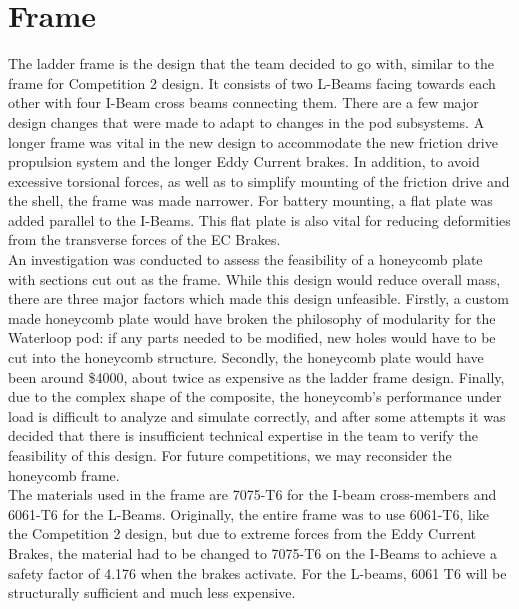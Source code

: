 \documentclass[main.tex]{subfiles}
\begin{document}
    \chapter{Frame}
    \label{ch:frame}
   	 The ladder frame is the design that the team decided to go with, similar to the frame for Competition 2 design. It consists of two L-Beams facing towards each other with four I-Beam cross beams connecting them. There are a few major design changes that were made to adapt to changes in the pod subsystems. A longer frame was vital in the new design to accommodate the new friction drive propulsion system and the longer Eddy Current brakes. In addition, to avoid excessive torsional forces, as well as to simplify mounting of the friction drive and the shell, the frame was made narrower. For battery mounting, a flat plate was added parallel to the I-Beams. This flat plate is also vital for reducing deformities from the transverse forces of the EC Brakes.\\

    An investigation was conducted to assess the feasibility of  a honeycomb plate with sections cut out as the frame. While this design would reduce overall mass, there are three major factors which made this design unfeasible. Firstly, a custom made honeycomb plate would have broken the philosophy of modularity for the Waterloop pod: if any parts needed to be modified, new holes would have to be cut into the honeycomb structure. Secondly, the honeycomb plate would have been around \$4000, about twice as expensive as the ladder frame design. Finally, due to the complex shape of the  composite, the honeycomb’s performance under load is difficult to analyze and simulate correctly, and after some attempts it was decided that there is insufficient technical expertise in the team to verify the feasibility of this design. For future competitions, we may reconsider the honeycomb frame.\\

    The materials used in the frame are 7075-T6 for the I-beam cross-members and 6061-T6 for the L-Beams. Originally, the entire frame was to use 6061-T6, like the Competition 2 design, but due to extreme forces from the Eddy Current Brakes, the material had to be changed to 7075-T6 on the I-Beams to achieve a safety factor of 4.176 when the brakes activate. For the L-beams, 6061 T6 will be structurally sufficient and much less expensive.
\end{document}
